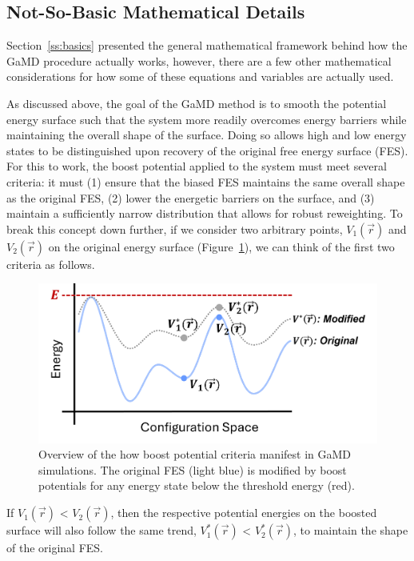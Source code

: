 \documentclass[9pt,tutorial]{livecoms}
\begin{document}
\subsection{Not-So-Basic Mathematical Details} \label{ss:notsobasics}
Section~\ref{ss:basics} presented the general mathematical framework behind how the GaMD procedure actually works, however, there are a few other mathematical considerations for how some of these equations and variables are actually used. 

As discussed above, the goal of the GaMD method is to smooth the potential energy surface such that the system more readily overcomes energy barriers while maintaining the overall shape of the surface. Doing so allows high and low energy states to be distinguished upon recovery of the original free energy surface (FES). For this to work, the boost potential applied to the system must meet several criteria: it must (1) ensure that the biased FES maintains the same overall shape as the original FES, (2) lower the energetic barriers on the surface, and (3) maintain a sufficiently narrow distribution that allows for robust reweighting. To break this concept down further, if we consider two arbitrary points, $V_{1}(\vec{r})$ and $V_{2}(\vec{r})$ on the original energy surface (Figure~\ref{fig:criteria12}), we can think of the first two criteria as follows. 

\bigskip
\begin{figure}[h] 
    \includegraphics[width=\columnwidth]{main_figs/criteria1_2.png}
    \caption{Overview of the how boost potential criteria manifest in GaMD simulations. The original FES (light blue) is modified by boost potentials for any energy state below the threshold energy (red).}
    \label{fig:criteria12}
\end{figure}

If $V_{1}(\vec{r})$ < $V_{2}(\vec{r})$, then the respective potential energies on the boosted surface will also follow the same trend, $V_{1}^{*}(\vec{r})$ < $V_{2}^{*}(\vec{r})$, to maintain the shape of the original FES. 
\end{document}
